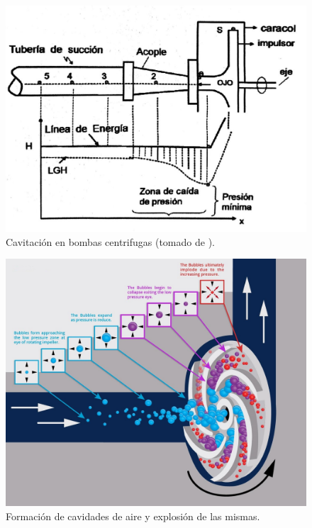 \documentclass[11pt, oneside]{article}
\begin{document}
\begin{figure}[h]
\centering
\includegraphics[width=12cm]{./figs/bom17.jpeg}
\caption{Cavitaci\'on en bombas centrifugas (tomado de \cite{agudelo2011mecanica}).} 
\label{bom17}
\end{figure}

\begin{figure}[h]
\centering
\includegraphics[width=12cm]{./figs/bom16.jpg}
\caption{Formaci\'on de cavidades de aire y explosi\'on de las mismas.} 
\label{bom16}
\end{figure}
\end{document}
